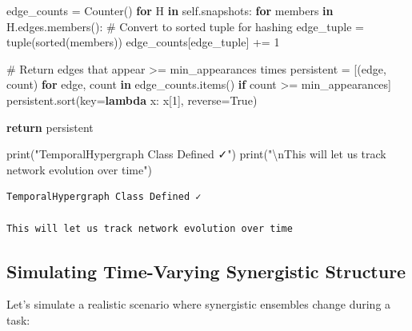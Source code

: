 \documentclass[
  11pt,
  letterpaper,
  oneside,
  openany]{book}
\newenvironment{Shaded}{\begin{snugshade}}{\end{snugshade}}
\newcommand{\BuiltInTok}[1]{\textcolor[rgb]{0.00,0.23,0.31}{#1}}
\newcommand{\CharTok}[1]{\textcolor[rgb]{0.13,0.47,0.30}{#1}}
\newcommand{\CommentTok}[1]{\textcolor[rgb]{0.37,0.37,0.37}{#1}}
\newcommand{\ControlFlowTok}[1]{\textcolor[rgb]{0.00,0.23,0.31}{\textbf{#1}}}
\newcommand{\DecValTok}[1]{\textcolor[rgb]{0.68,0.00,0.00}{#1}}
\newcommand{\KeywordTok}[1]{\textcolor[rgb]{0.00,0.23,0.31}{\textbf{#1}}}
\newcommand{\NormalTok}[1]{\textcolor[rgb]{0.00,0.23,0.31}{#1}}
\newcommand{\OperatorTok}[1]{\textcolor[rgb]{0.37,0.37,0.37}{#1}}
\newcommand{\StringTok}[1]{\textcolor[rgb]{0.13,0.47,0.30}{#1}}
\newcommand{\VariableTok}[1]{\textcolor[rgb]{0.07,0.07,0.07}{#1}}
\begin{document}
\begin{Shaded}
\begin{Highlighting}[]
\NormalTok{        edge\_counts }\OperatorTok{=}\NormalTok{ Counter()}
        \ControlFlowTok{for}\NormalTok{ H }\KeywordTok{in} \VariableTok{self}\NormalTok{.snapshots:}
            \ControlFlowTok{for}\NormalTok{ members }\KeywordTok{in}\NormalTok{ H.edges.members():}
                \CommentTok{\# Convert to sorted tuple for hashing}
\NormalTok{                edge\_tuple }\OperatorTok{=} \BuiltInTok{tuple}\NormalTok{(}\BuiltInTok{sorted}\NormalTok{(members))}
\NormalTok{                edge\_counts[edge\_tuple] }\OperatorTok{+=} \DecValTok{1}
        
        \CommentTok{\# Return edges that appear \textgreater{}= min\_appearances times}
\NormalTok{        persistent }\OperatorTok{=}\NormalTok{ [(edge, count) }\ControlFlowTok{for}\NormalTok{ edge, count }\KeywordTok{in}\NormalTok{ edge\_counts.items() }
                     \ControlFlowTok{if}\NormalTok{ count }\OperatorTok{\textgreater{}=}\NormalTok{ min\_appearances]}
\NormalTok{        persistent.sort(key}\OperatorTok{=}\KeywordTok{lambda}\NormalTok{ x: x[}\DecValTok{1}\NormalTok{], reverse}\OperatorTok{=}\VariableTok{True}\NormalTok{)}
        
        \ControlFlowTok{return}\NormalTok{ persistent}

\BuiltInTok{print}\NormalTok{(}\StringTok{"TemporalHypergraph Class Defined ✓"}\NormalTok{)}
\BuiltInTok{print}\NormalTok{(}\StringTok{"}\CharTok{\textbackslash{}n}\StringTok{This will let us track network evolution over time"}\NormalTok{)}
\end{Highlighting}
\end{Shaded}

\begin{verbatim}
TemporalHypergraph Class Defined ✓

This will let us track network evolution over time
\end{verbatim}

\subsection{Simulating Time-Varying Synergistic
Structure}\label{simulating-time-varying-synergistic-structure}

Let's simulate a realistic scenario where synergistic ensembles change
during a task:
\end{document}
